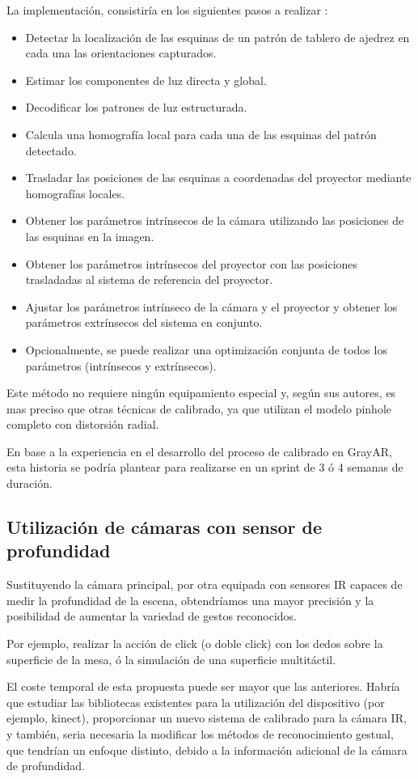La implementación, consistiría en los siguientes pasos a realizar \cite{Moreno}:
\begin{itemize}
\item Detectar la localización de las esquinas de un patrón de tablero de ajedrez en cada una las orientaciones capturados.
\item Estimar los componentes de luz directa y global.
\item Decodificar los patrones de luz estructurada.
\item Calcula una homografía local para cada una de las esquinas del patrón detectado.
\item Trasladar las posiciones de las esquinas a coordenadas del proyector mediante homografías locales.
\item Obtener los parámetros intrínsecos de la cámara utilizando las posiciones de las esquinas en la imagen.
\item Obtener los parámetros intrínsecos del proyector con las posiciones trasladadas al sistema de referencia del proyector.
\item Ajustar los parámetros intrínseco de la cámara y el proyector y obtener los parámetros extrínsecos del sistema en conjunto.
\item Opcionalmente, se puede realizar una optimización conjunta de todos los parámetros (intrínsecos y extrínsecos).
\end{itemize}

Este método no requiere ningún equipamiento especial y, según sus autores, es mas preciso que otras técnicas de calibrado, ya que utilizan el modelo pinhole completo con distorsión radial. 

En base a la experiencia en el desarrollo del proceso de calibrado en GrayAR, esta historia se podría plantear para realizarse en un sprint de 3 ó 4 semanas de duración.  

\subsection{Utilización de cámaras con sensor de profundidad} 

Sustituyendo la cámara principal, por otra equipada con sensores IR capaces de medir la profundidad de la escena, obtendríamos una mayor precisión y la posibilidad de aumentar la variedad de gestos reconocidos. 

Por ejemplo, realizar la acción de click (o doble click) con los dedos sobre la superficie de la mesa, ó la simulación de una superficie multitáctil.

El coste temporal de esta propuesta puede ser mayor que las anteriores. Habría que estudiar las bibliotecas existentes para la utilización del dispositivo (por ejemplo, kinect), proporcionar un nuevo sistema de calibrado para la cámara IR, y también, seria necesaria la modificar los métodos de reconocimiento gestual, que tendrían un enfoque distinto, debido a la información adicional de la cámara de profundidad.